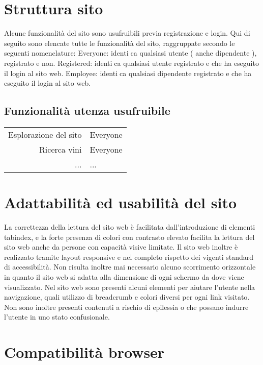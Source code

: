 \section{Struttura sito}

Alcune funzionalità del sito sono usufruibili previa registrazione e login. Qui di
seguito sono elencate tutte le funzionalità del sito, raggruppate secondo le seguenti
nomenclature:
Everyone: identica qualsiasi utente ( anche dipendente ), registrato e non.
Registered: identica qualsiasi utente registrato e che ha eseguito il login al sito
web. Employee: identica qualsiasi dipendente registrato e che ha eseguito il login
al sito web.

\subsection{Funzionalità utenza usufruibile}

\begin{center}
	\begin{tabular}{r|l}
		Esplorazione del sito & Everyone \\
		Ricerca vini & Everyone \\
		... & ... \\
	\end{tabular}
\end{center}

\section{Adattabilità ed usabilità del sito}

La correttezza della lettura del sito web è facilitata dall'introduzione di elementi
tabindex, e la forte presenza di colori con contrasto elevato facilita la lettura del
sito web anche da persone con capacità visive limitate. Il sito web inoltre è realizzato tramite layout responsive e nel completo rispetto dei vigenti standard di
accessibilità.
Non risulta inoltre mai necessario alcuno scorrimento orizzontale in quanto il sito
web si adatta alla dimensione di ogni schermo da dove viene visualizzato. Nel
sito web sono presenti alcuni elementi per aiutare l'utente nella navigazione, quali
utilizzo di breadcrumb e colori diversi per ogni link visitato. Non sono inoltre
presenti contenuti a rischio di epilessia o che possano indurre l'utente in uno stato
confusionale.

\section{Compatibilità browser}

